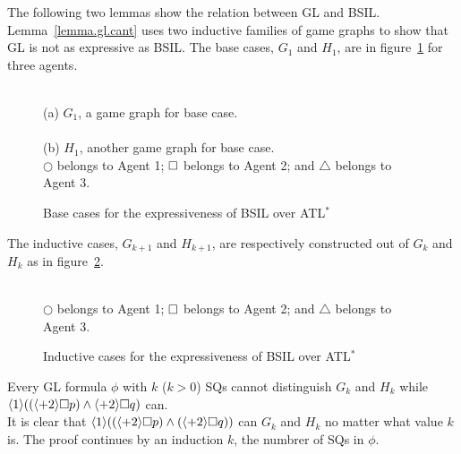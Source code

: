 The following two lemmas show the relation between GL and BSIL.  
Lemma~\ref{lemma.gl.cant} uses two inductive families of game graphs 
to show that GL is not as expressive as BSIL. 
The base cases, $G_1$ and $H_1$, are in figure~\ref{fig.gg.exp}
for three agents.
\begin{figure}[t]\begin{center}
\\
(a) $G_1$, a game graph for base case.\\
\\
(b) $H_1$, another game graph for base case.\\
$\bigcirc$ belongs to Agent  1; $\Box$ belongs to Agent 2; and 
$\triangle$ belongs to Agent 3.
\end{center}
\caption{Base cases for the expressiveness of BSIL over ATL$^*$}
\label{fig.gg.exp}
\end{figure}
The inductive cases, $G_{k+1}$ and $H_{k+1}$, are 
respectively constructed out of $G_k$ and $H_k$ as 
in figure~\ref{fig.gg.expi}.
\begin{figure}[t]\begin{center}
\\
$\bigcirc$ belongs to Agent  1; $\Box$ belongs to Agent 2; and 
$\triangle$ belongs to Agent 3.
\end{center}
\caption{Inductive cases for the expressiveness of BSIL over ATL$^*$}
\label{fig.gg.expi}
\end{figure}


{\lemma \label{lemma.gl.cant}
Every GL formula $\phi$ with $k$ ($k>0$) SQs cannot distinguish 
$G_k$ and $H_k$ while 
$\langle 1\rangle ((\langle+ 2\rangle\Box p)
    \wedge \langle+ 2\rangle\Box q)$ can.
}
\\\pf 
It is clear that
$\langle 1\rangle ((\langle+ 2\rangle \Box p)
    \wedge (\langle+ 2\rangle \Box q))$ can $G_k$ and $H_k$ 
no matter what value $k$ is.  
The proof continues by an induction $k$, the numbrer of SQs in $\phi$. 

